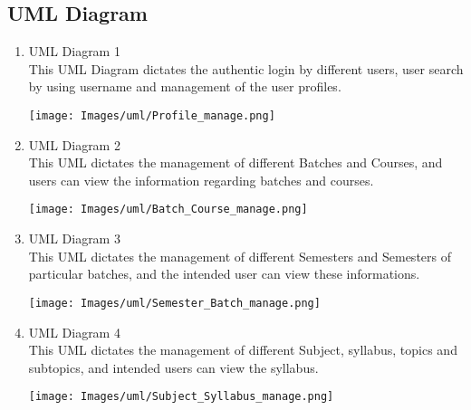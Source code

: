 \subsection{UML Diagram}
\begin{enumerate}
    \item UML Diagram 1 \\
    \hspace{1cm} This UML Diagram dictates the authentic login by different users, user search  by using username and management of the user profiles.
    \vspace{1cm}
    \begin{center}
        \texttt{[image: Images/uml/Profile\_manage.png]}
    \end{center}

    \newpage
    \item UML Diagram 2 \\
    \hspace{1cm} This UML dictates the management of different Batches and Courses, and users can view the information regarding batches and courses.
    \vspace{1cm}
    \begin{center}
        \texttt{[image: Images/uml/Batch\_Course\_manage.png]}
    \end{center}
       
    \newpage
    \item UML Diagram 3 \\
    \hspace{1cm} This UML dictates the management of different Semesters and Semesters of particular batches, and the intended user can view these informations.
    \vspace{1cm}
    \begin{center}
        \texttt{[image: Images/uml/Semester\_Batch\_manage.png]}
    \end{center}

    \newpage
    \item UML Diagram 4 \\
    \hspace{1cm} This UML dictates the management of different Subject, syllabus, topics and subtopics, and intended users can view the syllabus.
    \vspace{1cm}
    \begin{center}
        \texttt{[image: Images/uml/Subject\_Syllabus\_manage.png]}
    \end{center}
    

\end{enumerate}
